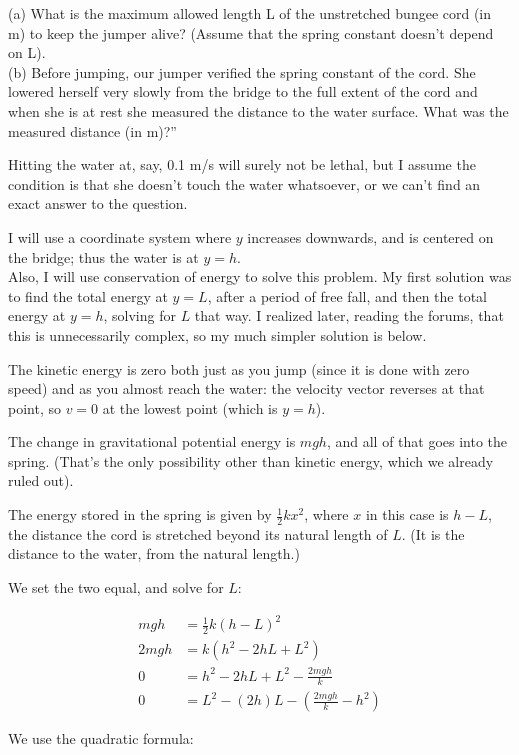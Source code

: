 \documentclass[8.01x]{subfiles}
\begin{document}
(a) What is the maximum allowed length L of the unstretched bungee cord (in m) to keep the jumper alive? (Assume that the spring constant doesn't depend on L).\\
(b) Before jumping, our jumper verified the spring constant of the cord. She lowered herself very slowly from the bridge to the full extent of the cord and when she is at rest she measured the distance to the water surface. What was the measured distance (in m)?''

Hitting the water at, say, 0.1 m/s will surely not be lethal, but I assume the condition is that she doesn't touch the water whatsoever, or we can't find an exact answer to the question.

I will use a coordinate system where $y$ increases downwards, and is centered on the bridge; thus the water is at $y = h$.\\
Also, I will use conservation of energy to solve this problem. My first solution was to find the total energy at $y = L$, after a period of free fall, and then the total energy at $y = h$, solving for $L$ that way. I realized later, reading the forums, that this is unnecessarily complex, so my much simpler solution is below.

The kinetic energy is zero both just as you jump (since it is done with zero speed) and as you almost reach the water: the velocity vector reverses at that point, so $v = 0$ at the lowest point (which is $y = h$).

The change in gravitational potential energy is $m g h$, and all of that goes into the spring. (That's the only possibility other than kinetic energy, which we already ruled out).

The energy stored in the spring is given by $\frac{1}{2} k x^2$, where $x$ in this case is $h - L$, the distance the cord is stretched beyond its natural length of $L$. (It is the distance to the water, from the natural length.)

We set the two equal, and solve for $L$:

\begin{align}
m g h &= \frac{1}{2} k (h - L)^2\\
2 m g h &= k (h^2 -2 h L + L^2)\\
0 &= h^2 -2 h L + L^2 - \frac{2 m g h}{k}\\
0 &= L^2 - (2 h) L - \left(\frac{2 m g h}{k} - h^2\right)
\end{align}

We use the quadratic formula:
\end{document}
